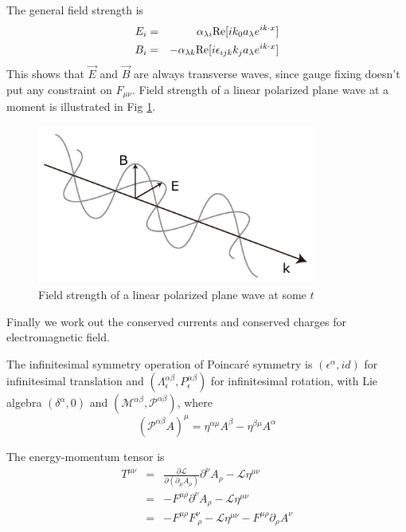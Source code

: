 \documentclass[12pt]{book}
\begin{document}
	
	The general field strength is
	\begin{eqnarray}
		E_i&=&\alpha_{\lambda i}{\rm Re}[ik_0a_\lambda e^{ik\cdot x}]\\
		B_i&=&-\alpha_{\lambda k}{\rm Re}[i\epsilon_{ijk}k_ja_\lambda e^{ik\cdot x}]
	\end{eqnarray}	
	This shows that $\vec E$ and $\vec B$ are always transverse waves, since gauge fixing doesn't put any constraint on $F_{\mu\nu}$.  Field strength of a linear polarized plane wave at a moment is illustrated in Fig \ref{fig:plane_wave}.
	
	\begin{figure}[htb]
		\centering  
		\includegraphics[width=260pt]{resources/chap_classical/1_9_plane_wave.pdf}
		\caption{Field strength of a linear polarized plane wave at some $t$}
		\label{fig:plane_wave} 
	\end{figure}
		
	Finally we work out the conserved currents and conserved charges for electromagnetic field.
	
	The infinitesimal symmetry operation of Poincar\'e symmetry is $(\epsilon^\alpha,id)$ for infinitesimal translation and $(\Lambda_\epsilon^{\alpha\beta},P^{\alpha\beta}_\epsilon)$ for infinitesimal rotation, with Lie algebra $(\delta^\alpha,0)$ and $(\mathcal M^{\alpha\beta},\mathcal P^{\alpha\beta})$, where
	\begin{equation}
		(\mathcal P^{\alpha\beta} A)^\mu=\eta^{\alpha\mu}A^\beta-\eta^{\beta\mu}A^\alpha
	\end{equation}
	
	The energy-momentum tensor is
	\begin{eqnarray}
	T^{\mu\nu}&=&\frac{\partial\mathcal{L}}{\partial(\partial_\mu A_\rho)}\partial^\nu A_\rho-\mathcal{L}\eta^{\mu\nu}\\
	&=&-F^{\mu\rho}\partial^\nu A_\rho-\mathcal{L}\eta^{\mu\nu}\\
	&=&-F^{\mu\rho}F^\nu_{\ \rho}-\mathcal{L}\eta^{\mu\nu}-F^{\mu\rho}\partial_\rho A^\nu
	\end{eqnarray}
	
\end{document}

